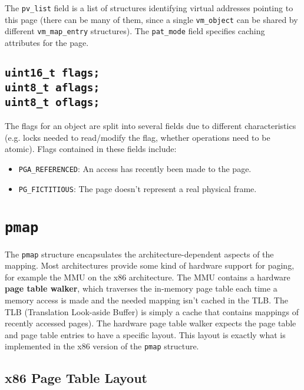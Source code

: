 \documentclass[shortabstract, english]{iithesis}
\begin{document}
The \texttt{pv_list} field is a list of structures identifying virtual
addresses pointing to this page (there can be many of them, since a single
\texttt{vm_object} can be shared by different
\texttt{vm_map_entry} structures). The \texttt{pat_mode} field
specifies caching attributes for the page.

\subsection*{\texttt{uint16_t flags;} \\ \texttt{uint8_t aflags;}
  \\ \texttt{uint8_t oflags;}}

The flags for an object are split into several fields due to different
characteristics (e.g. locks needed to read/modify the flag, whether operations
need to be atomic). Flags contained in these fields include:

\begin{itemize}
  \item \texttt{PGA_REFERENCED}: An access has recently been made to the page.
  \item \texttt{PG_FICTITIOUS}: The page doesn't represent a real physical frame.
\end{itemize}


\section{\texttt{pmap}}

The \texttt{pmap} structure encapsulates the architecture-dependent
aspects of the mapping. Most architectures provide some kind of hardware support
for paging, for example the MMU on the x86 architecture. The MMU contains a
hardware \textbf{page table walker}, which traverses the in-memory page table
each time a memory access is made and the needed mapping isn't cached in the
TLB. The TLB (Translation Look-aside Buffer) is simply a cache that contains
mappings of recently accessed pages). The hardware page table walker expects the
page table and page table entries to have a specific layout. This layout is
exactly what is implemented in the x86 version of the \texttt{pmap}
structure.

\subsection{x86 Page Table Layout}
\end{document}
